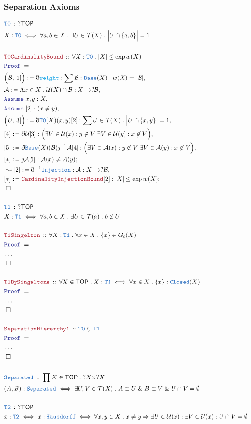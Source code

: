 \documentclass[12pt]{scrartcl}
\newcommand{\TYPE}[1]{\textcolor{NavyBlue}{\mathtt{#1}}}
\newcommand{\FUNC}[1]{\textcolor{Cerulean}{\mathtt{#1}}}
\newcommand{\LOGIC}[1]{\textcolor{Blue}{\mathtt{#1}}}
\newcommand{\THM}[1]{\textcolor{Maroon}{\mathtt{#1}}}
\renewcommand{\.}{\; . \;}
\newcommand{\de}{: \kern 0.1pc =}
\newcommand{\Theorem}[2]{& \THM{#1} \, :: \, #2 \\ & \Proof = \\ }
\newcommand{\DeclareType}[2]{& \TYPE{#1} \, :: \, #2 \\}
\newcommand{\DefineType}[3]{& #1 : \TYPE{#2} \iff #3 \\}
\newcommand{\DefineNamedType}[4]{& #1 : \TYPE{#2} \iff #3 \iff #4 \\}
\newcommand{\Page}[1]{ \begin{align*} #1 \end{align*}   }
\newcommand{ \bd }{ \ByDef }
\newcommand{\NoProof}{ & \ldots \\ \EndProof}
\renewcommand{\And}{\; \& \;}
\newcommand{\Imply}{\Rightarrow}
\newcommand{\ToInj}{\hookrightarrow}
\newcommand{\Say}[3]{& #1 \de #2 : #3, \\}
\newcommand{\Conclude}[3]{& #1 \de #2 : #3; \\}
\newcommand{\Derive}[3]{& \leadsto #1 \de #2 : #3, \\}
\newcommand{\Assume}[2]{& \LOGIC{Assume} \; #1 : #2, \\}
\newcommand{\QED}{\; \square}
\newcommand{\EndProof}{& \QED \\}
\newcommand{\ByDef}{\eth}
\newcommand{\ByConstr}{\jmath}
\newcommand{\Proof}{\LOGIC{Proof} \; }
\newcommand{\A}{\mathcal{A}}
\newcommand{\B}{\mathcal{B}}
\newcommand{\TOP}{\mathsf{TOP}}
\newcommand{\T}{\mathcal{T}}
\renewcommand{\U}{\mathcal{U}}
\begin{document}
\subsubsection{Separation Axioms}
\Page{
	\DeclareType{T0}{?\TOP}
	\DefineType{X}{T0}
	{
		\forall a,b \in X \. \exists U \in \T(X) \.
		\Big|U \cap \{a, b \}\Big| = 1 
	}
	\\
	\Theorem{T0CardinalityBound}
	{
		\forall X : \TYPE{T0} \.
		|X| \le \exp w(X)
	}
	\Say{\Big(\B,[1]\Big)}
	{
		\bd \FUNC{weight}
	}
	{
		\sum \B : \TYPE{Base}(X) \. w(X) = |\B|
	}
	\Say{\A}{\Lambda x \in X \. \U(X) \cap \B}
	{
		X \to ?\B
	}
	\Assume{x,y}{X}
	\Assume{[2]}{(x \neq y)}
	\Say{\Big(U,[3]\Big)}
	{
		\bd \TYPE{T0}(X)(x,y)[2]
	}
	{
		\sum U \in \T(X) \. \Big|U \cap \{x,y\}\Big| =  1
	}
	\Say{[4]}{\bd \U [3]}
	{
		\Big( \exists V  \in \U(x) : y \not \in V \big|
		\exists V  \in \U(y) : x \not \in V \Big)
	}
	\Say{[5]}{\bd \TYPE{Base}(X)(\B) \ByConstr^{-1} \A [4]}
	{
		\Big( \exists V  \in \A(x) : y \not \in V \big|
		\exists V  \in \A(y) : x \not \in V \Big)
	}
	\Conclude{[*]}{\ByConstr \A [5]}
	{
		\A(x) \neq \A(y)
	}
	\Derive{[2]}{\bd^{-1} \TYPE{Injection}}
	{
		\A : X \ToInj ?\B
	}
	\Conclude{[*]}{\THM{CardinalityInjectionBound}[2]}
	{ 
	  |X| \le  \exp w(X)
	}
	\EndProof
	\\
	\DeclareType{T1}{?\TOP}
	\DefineType{X}{T1}
	{
		\forall a,b \in X \.  \exists U \in \T(a) \.
		b \not \in U 
	}
	\\
	\Theorem{T1Singelton}
	{
		\forall X : \TYPE{T1} \. \forall x \in X \. 
		\{ x \} \in G_\delta(X)
	}
	\NoProof
	\\
	\Theorem{T1BySingeltons}
	{
		\forall X \in \TOP \.
		X : \TYPE{T1} \iff
		\forall x \in X \.
		\{x\} : \TYPE{Closed}(X)
	}
	\NoProof
	\\
	\Theorem{SeparationHierarchy1}
	{
		\TYPE{T0} \subsetneq \TYPE{T1}
	}
	\NoProof
	\\
	\DeclareType{Separated}
	{
		\prod X \in \TOP \.
		?X \times ?X
	}
	\DefineType{(A,B)}{Separated}
	{
		\exists U,V \in \T(X) \. A \subset U \And B \subset V \And U \cap V = \emptyset
	}
	\\
	\DeclareType{T2}{?\TOP}
	\DefineNamedType{x}{T2}{x : \TYPE{Hausdorff}}
	{
		\forall x,y \in X \.
		x \neq y \Imply 
		\exists U \in \U(x) : 
		\exists V \in \U(x) :
		U \cap V = \emptyset
	}
}
\end{document}
